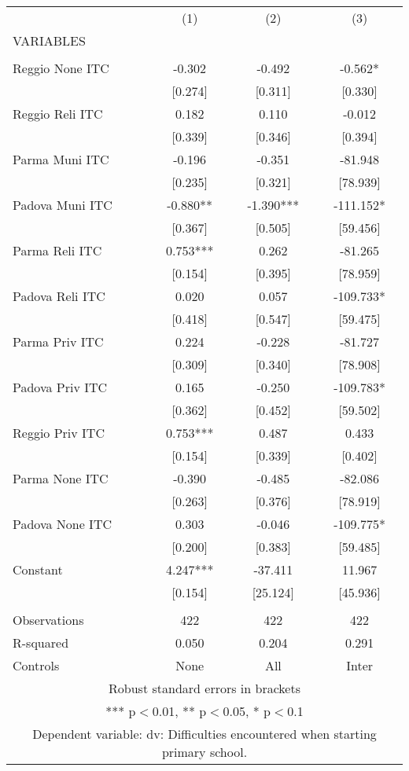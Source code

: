 \begin{tabular}{lccc} \hline
 & (1) & (2) & (3) \\
VARIABLES &  &  &  \\ \hline
 &  &  &  \\
Reggio None ITC & -0.302 & -0.492 & -0.562* \\
 & [0.274] & [0.311] & [0.330] \\
Reggio Reli ITC & 0.182 & 0.110 & -0.012 \\
 & [0.339] & [0.346] & [0.394] \\
Parma Muni ITC & -0.196 & -0.351 & -81.948 \\
 & [0.235] & [0.321] & [78.939] \\
Padova Muni ITC & -0.880** & -1.390*** & -111.152* \\
 & [0.367] & [0.505] & [59.456] \\
Parma Reli ITC & 0.753*** & 0.262 & -81.265 \\
 & [0.154] & [0.395] & [78.959] \\
Padova Reli ITC & 0.020 & 0.057 & -109.733* \\
 & [0.418] & [0.547] & [59.475] \\
Parma Priv ITC & 0.224 & -0.228 & -81.727 \\
 & [0.309] & [0.340] & [78.908] \\
Padova Priv ITC & 0.165 & -0.250 & -109.783* \\
 & [0.362] & [0.452] & [59.502] \\
Reggio Priv ITC & 0.753*** & 0.487 & 0.433 \\
 & [0.154] & [0.339] & [0.402] \\
Parma None ITC & -0.390 & -0.485 & -82.086 \\
 & [0.263] & [0.376] & [78.919] \\
Padova None ITC & 0.303 & -0.046 & -109.775* \\
 & [0.200] & [0.383] & [59.485] \\
Constant & 4.247*** & -37.411 & 11.967 \\
 & [0.154] & [25.124] & [45.936] \\
 &  &  &  \\
Observations & 422 & 422 & 422 \\
R-squared & 0.050 & 0.204 & 0.291 \\
 Controls & None & All & Inter \\ \hline
\multicolumn{4}{c}{ Robust standard errors in brackets} \\
\multicolumn{4}{c}{ *** p$<$0.01, ** p$<$0.05, * p$<$0.1} \\
\multicolumn{4}{c}{ Dependent variable: dv: Difficulties encountered when starting primary school.} \\
\end{tabular}
